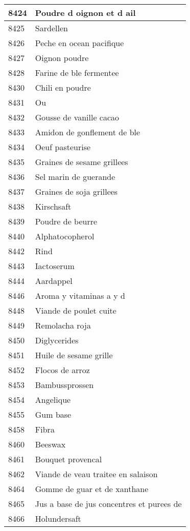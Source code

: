 \begin{longtable}{|l|l|}
8424 & Poudre d oignon et d ail \\ \hline 
8425 & Sardellen \\ \hline 
8426 & Peche en ocean pacifique \\ \hline 
8427 & Oignon poudre \\ \hline 
8428 & Farine de ble fermentee \\ \hline 
8430 & Chili en poudre \\ \hline 
8431 & Ou \\ \hline 
8432 & Gousse de vanille cacao \\ \hline 
8433 & Amidon de gonflement de ble \\ \hline 
8434 & Oeuf pasteurise \\ \hline 
8435 & Graines de sesame grillees \\ \hline 
8436 & Sel marin de guerande \\ \hline 
8437 & Graines de soja grillees \\ \hline 
8438 & Kirschsaft \\ \hline 
8439 & Poudre de beurre \\ \hline 
8440 & Alphatocopherol \\ \hline 
8442 & Rind \\ \hline 
8443 & Iactoserum \\ \hline 
8444 & Aardappel \\ \hline 
8446 & Aroma y vitaminas a y d \\ \hline 
8448 & Viande de poulet cuite \\ \hline 
8449 & Remolacha roja \\ \hline 
8450 & Diglycerides \\ \hline 
8451 & Huile de sesame grille \\ \hline 
8452 & Flocos de arroz \\ \hline 
8453 & Bambussprossen \\ \hline 
8454 & Angelique \\ \hline 
8455 & Gum base \\ \hline 
8458 & Fibra \\ \hline 
8460 & Beeswax \\ \hline 
8461 & Bouquet provencal \\ \hline 
8462 & Viande de veau traitee en salaison \\ \hline 
8464 & Gomme de guar et de xanthane \\ \hline 
8465 & Jus a base de jus concentres et purees de \\ \hline 
8466 & Holundersaft \\ \hline 

\end{longtable}
